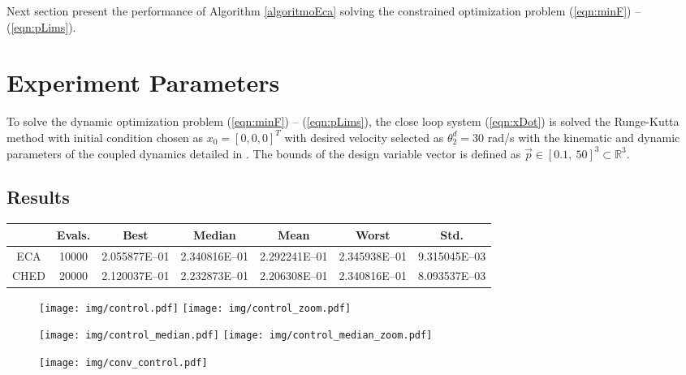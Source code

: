 \documentclass[12pt,letterpape]{article}
\begin{document}
Next section present the performance of Algorithm \ref{algoritmoEca} solving the
constrained optimization problem (\ref{eqn:minF}) -- (\ref{eqn:pLims}).

\section{Experiment Parameters} %
\label{sec:experiment_parameters}

To solve the dynamic optimization problem (\ref{eqn:minF}) -- (\ref{eqn:pLims}),
the close loop system (\ref{eqn:xDot}) is solved the Runge-Kutta method
\cite{dormand80} with initial condition chosen as $x_0 = [0,0,0]^T$ with desired
velocity selected as $\theta_2^d = 30$ rad/s with the kinematic and dynamic parameters
of the coupled dynamics detailed in \cite{calva13}. The bounds of the design
variable vector is defined as $\vec{p} \in [0.1, \ 50]^3 \subset \mathbb{R}^3 $.


\subsection{Results} %
\label{sub:results}


\begin{table}[!ht]
	\centering
	\begin{tabular}{ccccccc}
		\hline
		& {\bf Evals.} & {\bf Best} & {\bf Median} & {\bf Mean} & {\bf Worst} & {\bf Std.} \\ \hline
		ECA & 10000 & 2.055877E--01 & 2.340816E--01 & 2.292241E--01 & 2.345938E--01 & 9.315045E--03 \\ \hline
		CHED & 20000 & 2.120037E--01 & 2.232873E--01 & 2.206308E--01 & 2.340816E--01 & 8.093537E--03 \\ \hline
	\end{tabular}
\end{table}

\begin{figure}[!ht]
	\centering
	\texttt{[image: img/control.pdf]}
	\texttt{[image: img/control\_zoom.pdf]}
\end{figure}

\begin{figure}[!ht]
	\centering
	\texttt{[image: img/control\_median.pdf]}
	\texttt{[image: img/control\_median\_zoom.pdf]}
\end{figure}

\begin{figure}[!ht]
	\centering
	\texttt{[image: img/conv\_control.pdf]}
\end{figure}




\clearpage


\end{document}
